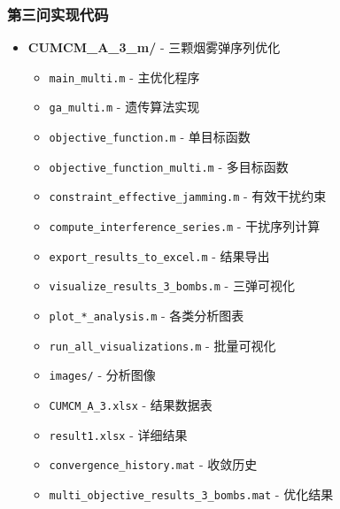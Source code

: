 \subsubsection{第三问实现代码}
\begin{itemize}
    \item \textbf{CUMCM\_A\_3\_m/} - 三颗烟雾弹序列优化
    \begin{itemize}
        \item \texttt{main\_multi.m} - 主优化程序
        \item \texttt{ga\_multi.m} - 遗传算法实现
        \item \texttt{objective\_function.m} - 单目标函数
        \item \texttt{objective\_function\_multi.m} - 多目标函数
        \item \texttt{constraint\_effective\_jamming.m} - 有效干扰约束
        \item \texttt{compute\_interference\_series.m} - 干扰序列计算
        \item \texttt{export\_results\_to\_excel.m} - 结果导出
        \item \texttt{visualize\_results\_3\_bombs.m} - 三弹可视化
        \item \texttt{plot\_*\_analysis.m} - 各类分析图表
        \item \texttt{run\_all\_visualizations.m} - 批量可视化
        \item \texttt{images/} - 分析图像
        \item \texttt{CUMCM\_A\_3.xlsx} - 结果数据表
        \item \texttt{result1.xlsx} - 详细结果
        \item \texttt{convergence\_history.mat} - 收敛历史
        \item \texttt{multi\_objective\_results\_3\_bombs.mat} - 优化结果
    \end{itemize}
\end{itemize}


